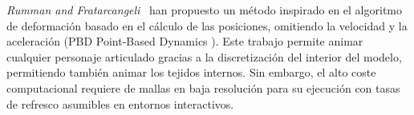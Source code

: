 \emph{Rumman and Fratarcangeli}~\cite{abu2015position} han propuesto un método inspirado en el algoritmo de deformación basado en el cálculo de las posiciones, omitiendo la velocidad y la aceleración (PBD Point-Based Dynamics \cite{Bender:2014}). Este trabajo permite animar cualquier personaje articulado gracias a la discretización del interior del modelo, permitiendo también animar los tejidos internos. Sin embargo, el alto coste computacional requiere de mallas en baja resolución para su ejecución con tasas de refresco asumibles en entornos interactivos.%

